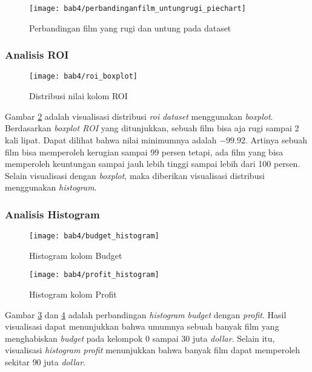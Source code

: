 \begin{figure}[H]
	\centering  
	\texttt{[image: bab4/perbandinganfilm\_untungrugi\_piechart]}   
	\caption{Perbandingan film yang rugi dan untung pada dataset}
	\label{fig:perbandinganfilm_untungrugi_piechart} 
\end{figure} 


\subsubsection{Analisis ROI}

\begin{figure}[H]
	\centering  
	\texttt{[image: bab4/roi\_boxplot]}   
	\caption{Distribusi nilai kolom ROI}
	\label{fig:roi_boxplot} 
\end{figure} 


Gambar \ref{fig:roi_boxplot} adalah visualisasi distribusi \textit{roi} \textit{dataset} menggunakan \textit{boxplot}. Berdasarkan \textit{boxplot ROI} yang ditunjukkan, sebuah film bisa aja rugi sampai 2 kali lipat. Dapat dilihat bahwa nilai minimumnya adalah $-99.92$. Artinya sebuah film bisa memperoleh kerugian sampai 99 persen tetapi, ada film yang bisa memperoleh keuntungan sampai jauh lebih tinggi sampai lebih dari 100 persen. Selain visualisasi dengan \textit{boxplot}, maka diberikan visualisasi distribusi menggunakan \textit{histogram}.


\subsubsection{Analisis Histogram}

\begin{figure}[H]
	\centering  
	\texttt{[image: bab4/budget\_histogram]}   
	\caption{Histogram kolom Budget}
	\label{fig:budget_histogram} 
\end{figure} 



\begin{figure}[H]
	\centering  
	\texttt{[image: bab4/profit\_histogram]}   
	\caption{Histogram kolom Profit}
	\label{fig:profit_histogram} 
\end{figure} 

Gambar \ref{fig:budget_histogram} dan \ref{fig:profit_histogram} adalah perbandingan \textit{histogram} \textit{budget} dengan \textit{profit}. Hasil visualisasi dapat menunjukkan bahwa umumnya sebuah banyak film yang menghabiskan \textit{budget} pada kelompok $0$ sampai $30$ juta \textit{dollar}. Selain itu, visualisasi \textit{histogram profit} menunjukkan bahwa banyak film dapat memperoleh  sekitar $90$ juta \textit{dollar}. 


